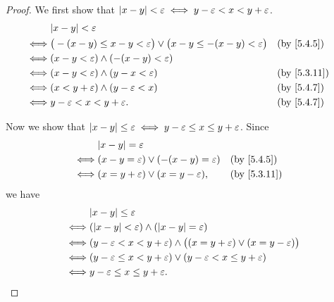 \begin{proof}
  We first show that \(\left\lvert x - y\right\rvert < \varepsilon \iff y - \varepsilon < x < y + \varepsilon\).
  \begin{align*}
         & \abs{x - y} < \varepsilon                                                                                                   \\
    \iff & \big(-(x - y) \leq x - y < \varepsilon\big) \lor \big(x - y \leq -(x - y) < \varepsilon\big) &  & \by{5.4.5}                \\
    \iff & (x - y < \varepsilon) \land (-(x - y) < \varepsilon)                                                                        \\
    \iff & (x - y < \varepsilon) \land (y - x < \varepsilon)                                            &  & \text{(by \cref{5.3.11})} \\
    \iff & (x < y + \varepsilon) \land (y - \varepsilon < x)                                            &  & \by{5.4.7}                \\
    \iff & y - \varepsilon < x < y + \varepsilon.                                                       &  & \by{5.4.7}
  \end{align*}

  Now we show that \(\left\lvert x - y\right\rvert \leq \varepsilon \iff y - \varepsilon \leq x \leq y + \varepsilon\).
  Since
  \begin{align*}
         & \abs{x - y} = \varepsilon                                                          \\
    \iff & (x - y = \varepsilon) \lor (-(x - y) = \varepsilon) &  & \by{5.4.5}                \\
    \iff & (x = y + \varepsilon) \lor (x = y - \varepsilon),   &  & \text{(by \cref{5.3.11})}
  \end{align*}
  we have
  \begin{align*}
         & \abs{x - y} \leq \varepsilon                                                                             \\
    \iff & (\abs{x - y} < \varepsilon) \land (\abs{x - y} = \varepsilon)                                            \\
    \iff & (y - \varepsilon < x < y + \varepsilon) \land \big((x = y + \varepsilon) \lor (x = y - \varepsilon)\big) \\
    \iff & (y - \varepsilon \leq x < y + \varepsilon) \lor (y - \varepsilon < x \leq y + \varepsilon)               \\
    \iff & y - \varepsilon \leq x \leq y + \varepsilon.
  \end{align*}
\end{proof}

